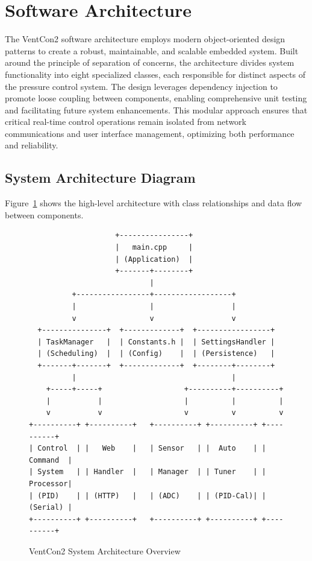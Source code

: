 
\section{Software Architecture}
\label{sec:software-arch}

The VentCon2 software architecture employs modern object-oriented design patterns to create a robust, maintainable, and scalable embedded system. Built around the principle of separation of concerns, the architecture divides system functionality into eight specialized classes, each responsible for distinct aspects of the pressure control system. The design leverages dependency injection to promote loose coupling between components, enabling comprehensive unit testing and facilitating future system enhancements. This modular approach ensures that critical real-time control operations remain isolated from network communications and user interface management, optimizing both performance and reliability.

\subsection{System Architecture Diagram}
Figure~\ref{fig:system-overview} shows the high-level architecture with class relationships and data flow between components.

\begin{figure}[H]
\centering
\begin{verbatim}
                    +----------------+
                    |   main.cpp     |
                    | (Application)  |
                    +-------+--------+
                            |
          +-----------------+------------------+
          |                 |                  |
          v                 v                  v
  +---------------+  +-------------+  +-----------------+
  | TaskManager   |  | Constants.h |  | SettingsHandler |
  | (Scheduling)  |  | (Config)    |  | (Persistence)   |
  +-------+-------+  +-------------+  +--------+--------+
          |                                    |
    +-----+-----+                   +----------+----------+
    |           |                   |          |          |
    v           v                   v          v          v
+----------+ +----------+   +----------+ +----------+ +----------+
| Control  | |   Web    |   | Sensor   | |  Auto    | | Command  |
| System   | | Handler  |   | Manager  | | Tuner    | | Processor|
| (PID)    | | (HTTP)   |   | (ADC)    | | (PID-Cal)| | (Serial) |
+----------+ +----------+   +----------+ +----------+ +----------+
\end{verbatim}
\caption{VentCon2 System Architecture Overview}
\label{fig:system-overview}
\end{figure}

